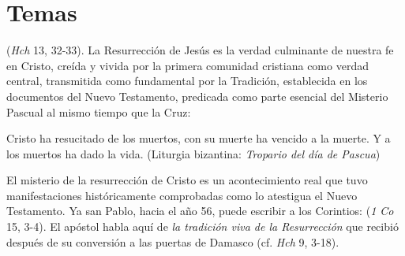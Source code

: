 \newsection
\section{Temas}
\label{temasc04}



\begin{ccebody}
  (\textit{Hch} 13, 32-33). La Resurrección de Jesús es la verdad culminante de nuestra fe en Cristo, creída y vivida por la primera comunidad cristiana como verdad central, transmitida como fundamental por la Tradición, establecida en los documentos del Nuevo Testamento, predicada como parte esencial del Misterio Pascual al mismo tiempo que la Cruz:

\begin{cceprose}
Cristo ha resucitado de los muertos,
   con su muerte ha vencido a la muerte.
   Y a los muertos ha dado la vida.
   (Liturgia bizantina: \textit{Tropario del día de Pascua})
\end{cceprose}

 El misterio de la resurrección de Cristo es un acontecimiento real que tuvo manifestaciones históricamente comprobadas como lo atestigua el Nuevo Testamento. Ya san Pablo, hacia el año 56, puede escribir a los Corintios:  (\textit{1 Co} 15, 3-4). El apóstol habla aquí de \textit{la tradición viva de la Resurrección} que recibió después de su conversión a las puertas de Damasco (cf. \textit{Hch} 9, 3-18).



\end{ccebody}
